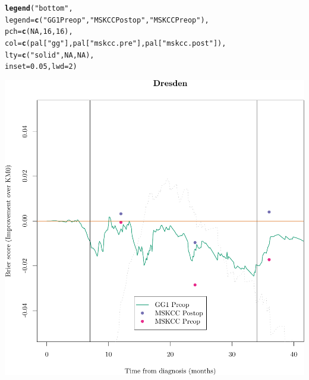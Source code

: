 \documentclass{article}\usepackage[]{graphicx}\usepackage[]{color}
\makeatletter
\def\maxwidth{ %
  \ifdim\Gin@nat@width>\linewidth
    \linewidth
  \else
    \Gin@nat@width
  \fi
}
\newcommand{\hlnum}[1]{\textcolor[rgb]{0.686,0.059,0.569}{#1}}%
\newcommand{\hlstr}[1]{\textcolor[rgb]{0.192,0.494,0.8}{#1}}%
\newcommand{\hlstd}[1]{\textcolor[rgb]{0.345,0.345,0.345}{#1}}%
\newcommand{\hlkwc}[1]{\textcolor[rgb]{0.333,0.667,0.333}{#1}}%
\newcommand{\hlkwd}[1]{\textcolor[rgb]{0.737,0.353,0.396}{\textbf{#1}}}%
\newenvironment{kframe}{%
 \def\at@end@of@kframe{}%
 \ifinner\ifhmode%
  \def\at@end@of@kframe{\end{minipage}}%
  \begin{minipage}{\columnwidth}%
 \fi\fi%
 \def\FrameCommand##1{\hskip\@totalleftmargin \hskip-\fboxsep
 \colorbox{shadecolor}{##1}\hskip-\fboxsep
     \hskip-\linewidth \hskip-\@totalleftmargin \hskip\columnwidth}%
 \MakeFramed {\advance\hsize-\width
   \@totalleftmargin\z@ \linewidth\hsize
   \@setminipage}}%
 {\par\unskip\endMakeFramed%
 \at@end@of@kframe}
\newenvironment{knitrout}{}{} %
\makeatother
\begin{document}
\begin{knitrout}
\begin{kframe}
\begin{alltt}
\hlkwd{legend}\hlstd{(}\hlstr{"bottom"}\hlstd{,}
        \hlkwc{legend} \hlstd{=} \hlkwd{c}\hlstd{(}     \hlstr{"GG1 Preop"}\hlstd{,}    \hlstr{"MSKCC Postop"}\hlstd{,}         \hlstr{"MSKCC Preop"}\hlstd{),}
        \hlkwc{pch} \hlstd{=} \hlkwd{c}\hlstd{(}        \hlnum{NA}\hlstd{,}                     \hlnum{16}\hlstd{,}                             \hlnum{16}\hlstd{),}
        \hlkwc{col} \hlstd{=} \hlkwd{c}\hlstd{(        pal[}\hlstr{"gg"}\hlstd{],              pal[}\hlstr{"mskcc.pre"}\hlstd{],       pal[}\hlstr{"mskcc.post"}\hlstd{]),}
        \hlkwc{lty} \hlstd{=} \hlkwd{c}\hlstd{(}        \hlstr{"solid"}\hlstd{,}                \hlnum{NA}\hlstd{,}                             \hlnum{NA}\hlstd{),}
        \hlkwc{inset} \hlstd{=} \hlnum{0.05}\hlstd{,} \hlkwc{lwd} \hlstd{=} \hlnum{2}\hlstd{)}
\end{alltt}
\end{kframe}

{\centering \includegraphics[width=\maxwidth]{figure/07-prob-bs-paths-plot-dresden-4} 

}



\end{knitrout}
\end{document}
